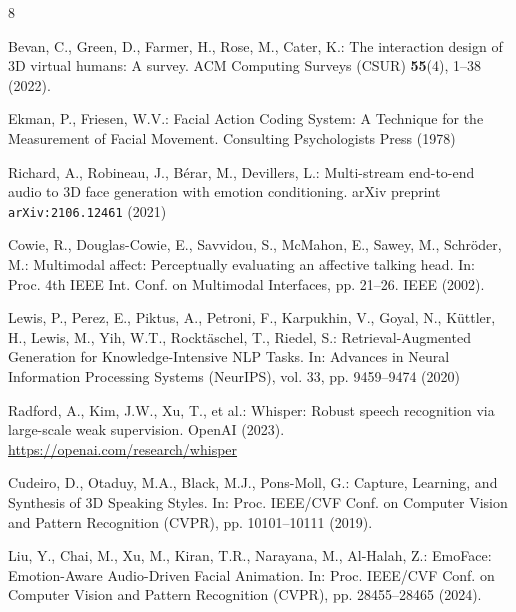 \documentclass[runningheads]{llncs}
\begin{document}
%
%
%
% 
% 
%
\begin{thebibliography}{8}

Bevan, C., Green, D., Farmer, H., Rose, M., Cater, K.: The interaction design of 3D virtual humans: A survey. ACM Computing Surveys (CSUR) \textbf{55}(4), 1–38 (2022). 

Ekman, P., Friesen, W.V.: Facial Action Coding System: A Technique for the Measurement of Facial Movement. Consulting Psychologists Press (1978)

Richard, A., Robineau, J., Bérar, M., Devillers, L.: Multi-stream end-to-end audio to 3D face generation with emotion conditioning. arXiv preprint \texttt{arXiv:2106.12461} (2021)

Cowie, R., Douglas-Cowie, E., Savvidou, S., McMahon, E., Sawey, M., Schröder, M.: Multimodal affect: Perceptually evaluating an affective talking head. In: Proc. 4th IEEE Int. Conf. on Multimodal Interfaces, pp. 21–26. IEEE (2002). 

Lewis, P., Perez, E., Piktus, A., Petroni, F., Karpukhin, V., Goyal, N., Küttler, H., Lewis, M., Yih, W.T., Rocktäschel, T., Riedel, S.: Retrieval-Augmented Generation for Knowledge-Intensive NLP Tasks. In: Advances in Neural Information Processing Systems (NeurIPS), vol. 33, pp. 9459–9474 (2020)

Radford, A., Kim, J.W., Xu, T., et al.: Whisper: Robust speech recognition via large-scale weak supervision. OpenAI (2023). \url{https://openai.com/research/whisper}

Cudeiro, D., Otaduy, M.A., Black, M.J., Pons-Moll, G.: Capture, Learning, and Synthesis of 3D Speaking Styles. In: Proc. IEEE/CVF Conf. on Computer Vision and Pattern Recognition (CVPR), pp. 10101–10111 (2019). 

Liu, Y., Chai, M., Xu, M., Kiran, T.R., Narayana, M., Al-Halah, Z.: EmoFace: Emotion-Aware Audio-Driven Facial Animation. In: Proc. IEEE/CVF Conf. on Computer Vision and Pattern Recognition (CVPR), pp. 28455–28465 (2024). 

\end{thebibliography}
\end{document}
